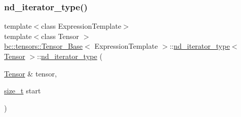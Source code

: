 \subsubsection{\texorpdfstring{nd\+\_\+iterator\+\_\+type()}{nd\_iterator\_type()}\hspace{0.1cm}{\footnotesize\ttfamily [2/3]}}
{\footnotesize\ttfamily template$<$class Expression\+Template$>$ \\
template$<$class Tensor $>$ \\
\hyperlink{classbc_1_1tensors_1_1Tensor__Base}{bc\+::tensors\+::\+Tensor\+\_\+\+Base}$<$ Expression\+Template $>$\+::\hyperlink{structbc_1_1tensors_1_1Tensor__Base_1_1nd__iterator__type}{nd\+\_\+iterator\+\_\+type}$<$ \hyperlink{namespacebc_a659391e47ab612be3ba6c18cf9c89159}{Tensor} $>$\+::\hyperlink{structbc_1_1tensors_1_1Tensor__Base_1_1nd__iterator__type}{nd\+\_\+iterator\+\_\+type} (\begin{DoxyParamCaption}\item[{\hyperlink{namespacebc_a659391e47ab612be3ba6c18cf9c89159}{Tensor} \&}]{tensor,  }\item[{\hyperlink{structbc_1_1tensors_1_1Tensor__Base_1_1nd__iterator__type_a61b9b5bad77746684cc457b24b2cc202}{size\+\_\+t}}]{start }\end{DoxyParamCaption})\hspace{0.3cm}{\ttfamily [inline]}}

\mbox{\label{structbc_1_1tensors_1_1Tensor__Base_1_1nd__iterator__type_ae7e6b50cfff52dafe4a68259120d3ab8}} 
